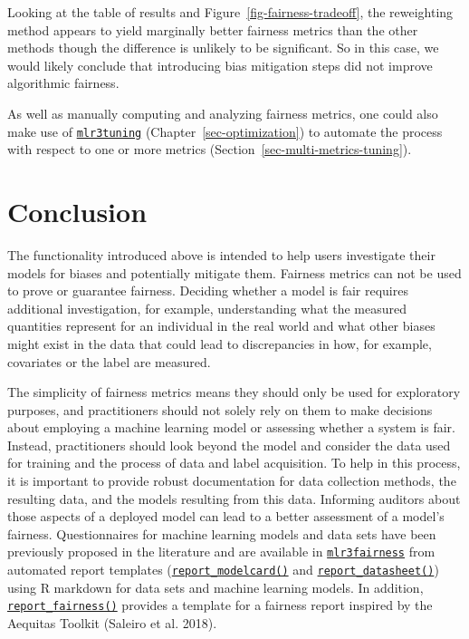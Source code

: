 Looking at the table of results and Figure~\ref{fig-fairness-tradeoff},
the reweighting method appears to yield marginally better fairness
metrics than the other methods though the difference is unlikely to be
significant. So in this case, we would likely conclude that introducing
bias mitigation steps did not improve algorithmic fairness.

As well as manually computing and analyzing fairness metrics, one could
also make use of
\href{https://mlr3tuning.mlr-org.com}{\texttt{mlr3tuning}}
(Chapter~\ref{sec-optimization}) to automate the process with respect to
one or more metrics (Section~\ref{sec-multi-metrics-tuning}).

\hypertarget{conclusion-11}{%
\section{Conclusion}\label{conclusion-11}}

The functionality introduced above is intended to help users investigate
their models for biases and potentially mitigate them. Fairness metrics
can not be used to prove or guarantee fairness. Deciding whether a model
is fair requires additional investigation, for example, understanding
what the measured quantities represent for an individual in the real
world and what other biases might exist in the data that could lead to
discrepancies in how, for example, covariates or the label are measured.

The simplicity of fairness metrics means they should only be used for
exploratory purposes, and practitioners should not solely rely on them
to make decisions about employing a machine learning model or assessing
whether a system is fair. Instead, practitioners should look beyond the
model and consider the data used for training and the process of data
and label acquisition. To help in this process, it is important to
provide robust documentation for data collection methods, the resulting
data, and the models resulting from this data. Informing auditors about
those aspects of a deployed model can lead to a better assessment of a
model's fairness. Questionnaires for machine learning models and data
sets have been previously proposed in the literature and are available
in
\href{https://mlr3fairness.mlr-org.com}{\texttt{mlr3fairness}}
from automated report templates
(\href{https://mlr3fairness.mlr-org.com/reference/report_modelcard.html}{\texttt{report\_modelcard()}}
and
\href{https://mlr3fairness.mlr-org.com/reference/report_datasheet.html}{\texttt{report\_datasheet()}})
using R markdown for data sets and machine learning models. In addition,
\href{https://mlr3fairness.mlr-org.com/reference/report_fairness.html}{\texttt{report\_fairness()}}
provides a template for a fairness
report inspired by the Aequitas Toolkit (Saleiro et
al. 2018).


